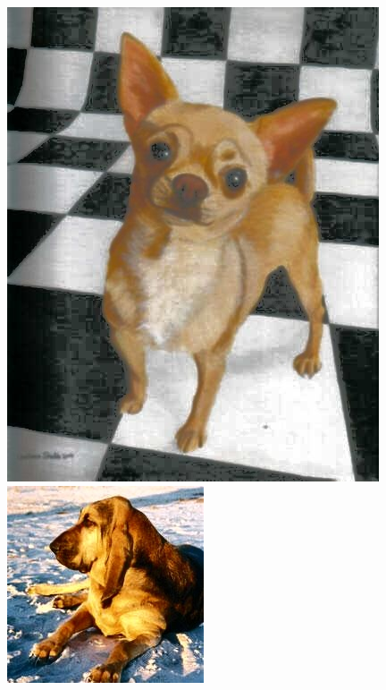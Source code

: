 \begin{appendices}
\begin{figure}[htb]
\begin{minipage}{0.19\textwidth}
\includegraphics[width=\textwidth]{images/anomalien/HA/n02085620_952.jpg}
\end{minipage}
\begin{minipage}{0.19\textwidth}
\includegraphics[width=.8\textwidth]{images/anomalien/HA/n02088466_9359.jpg}

\end{minipage}
\end{figure}
\end{appendices}
